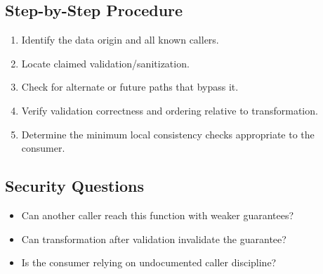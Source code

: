 \documentclass[10pt]{article}
\begin{document}
\subsection*{Step-by-Step Procedure}
\begin{enumerate}
\item Identify the data origin and all known callers.
\item Locate claimed validation/sanitization.
\item Check for alternate or future paths that bypass it.
\item Verify validation correctness and ordering relative to transformation.
\item Determine the minimum local consistency checks appropriate to the consumer.
\end{enumerate}
\subsection*{Security Questions}
\begin{itemize}
\item Can another caller reach this function with weaker guarantees?
\item Can transformation after validation invalidate the guarantee?
\item Is the consumer relying on undocumented caller discipline?
\end{itemize}

\end{document}
